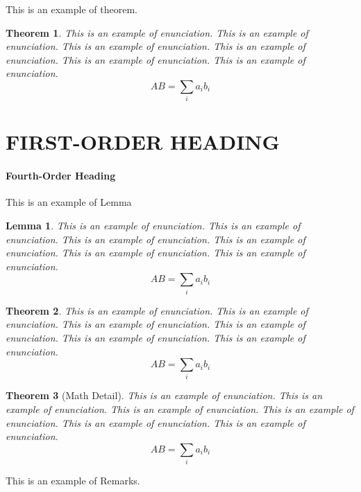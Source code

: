 \documentclass{jpp}
\newtheorem{theorem}{Theorem}
\newtheorem{lemma}{Lemma}
\begin{document}
This is an example of theorem.

\begin{theorem}
This is an example of enunciation. This is an example of enunciation. This is an
example of enunciation. This is an example of enunciation. This is an example of enunciation.
This is an example of enunciation.
\begin{equation*}
AB = \sum_{i} a_{i} b_{i}
\end{equation*}
\end{theorem}

\section{FIRST-ORDER HEADING}
\paragraph{Fourth-Order Heading}

This is an example of Lemma
\begin{lemma}
This is an example of enunciation. This is an example of enunciation. This is an
example of enunciation. This is an example of enunciation. This is an example of enunciation.
This is an example of enunciation.
\begin{equation*}
AB = \sum_{i} a_{i} b_{i}
\end{equation*}
\end{lemma}

\begin{theorem}
This is an example of enunciation. This is an example of enunciation. This is an
example of enunciation. This is an example of enunciation. This is an example of enunciation.
This is an example of enunciation.
\begin{equation*}
AB = \sum_{i} a_{i} b_{i}
\end{equation*}
\end{theorem}

\begin{theorem}[Math Detail]
This is an example of enunciation. This is an example of enunciation. This is an
example of enunciation. This is an example of enunciation. This is an example of enunciation.
This is an example of enunciation.
\begin{equation*}
AB = \sum_{i} a_{i} b_{i}
\end{equation*}
\end{theorem}

This is an example of Remarks.
\end{document}
